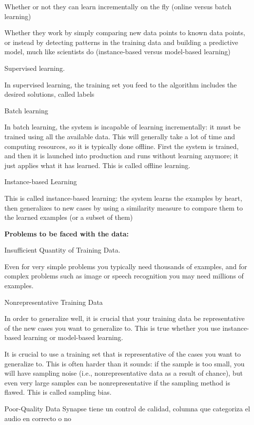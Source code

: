 \documentclass[12pt, a4paper]{article}
\begin{document}
	Whether or not they can learn incrementally on the fly (online versus batch learning)
	
	Whether they work by simply comparing new data points to known data points, or instead by detecting patterns in the training data and building a predictive model, much like scientists do (instance-based versus model-based learning)
	
	Supervised learning.
	
	In supervised learning, the training set you feed to the algorithm includes the desired solutions, called labels
	
	Batch learning
	
	In batch learning, the system is incapable of learning incrementally: it must be trained using all the available data. This will generally take a lot of time and computing resources, so it is typically done offline. First the system is trained, and then it is launched into production and runs without learning anymore; it just applies what it has learned. This is called offline learning.
	
	Instance-based Learning
	
	This is called instance-based learning: the system learns the examples by heart, then generalizes to new cases by using a similarity measure to compare them to the learned examples (or a subset of them)
	
	\textbf{Problems to be faced with the data:}
	
	Insufficient Quantity of Training Data.
	
	Even for very simple problems you typically need thousands of examples, and for complex problems such as image or speech recognition you may need millions of examples.
	
	Nonrepresentative Training Data
	
	In order to generalize well, it is crucial that your training data be representative of the new cases you want to generalize to. This is true whether you use instance-based learning or model-based learning.
	
	It is crucial to use a training set that is representative of the cases you want to generalize to. This is often harder than it sounds: if the sample is too small, you will have sampling noise (i.e., nonrepresentative data as a result of chance), but even very large samples can be nonrepresentative if the sampling method is flawed. This is called sampling bias.
	
	Poor-Quality Data %
	Synapse tiene un control de calidad, columna que categoriza el audio en correcto o no 
	
\end{document}
